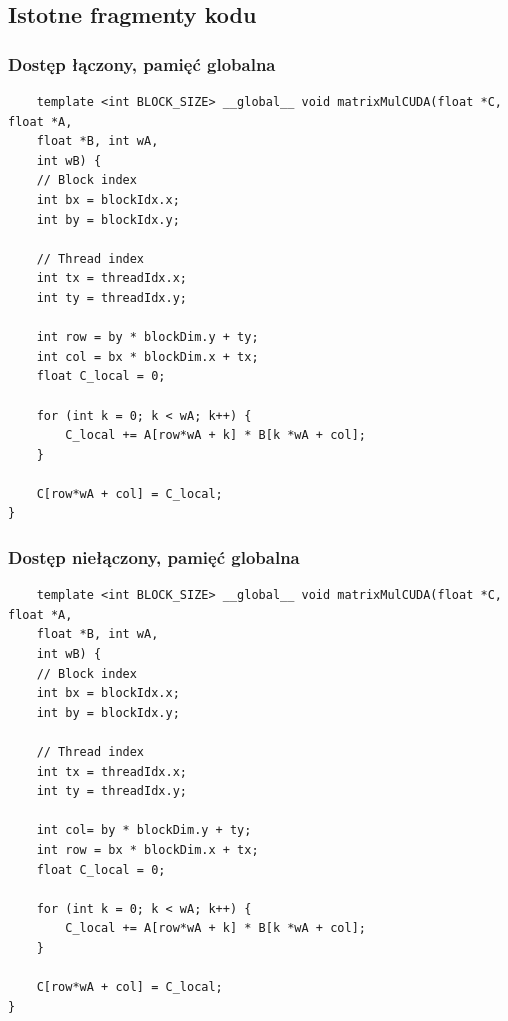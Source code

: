\documentclass[10pt,a4paper]{article}
\begin{document}
\newpage

\subsection{Istotne fragmenty kodu}
\subsubsection*{Dostęp łączony, pamięć globalna}
\begin{lstlisting}
	template <int BLOCK_SIZE> __global__ void matrixMulCUDA(float *C, float *A,
	float *B, int wA,
	int wB) {
	// Block index
	int bx = blockIdx.x;
	int by = blockIdx.y;

	// Thread index
	int tx = threadIdx.x;
	int ty = threadIdx.y;

	int row = by * blockDim.y + ty;
	int col = bx * blockDim.x + tx;
	float C_local = 0;

	for (int k = 0; k < wA; k++) {
		C_local += A[row*wA + k] * B[k *wA + col];
	}

	C[row*wA + col] = C_local;
}
\end{lstlisting}

\subsubsection*{Dostęp niełączony, pamięć globalna}
\begin{lstlisting}
	template <int BLOCK_SIZE> __global__ void matrixMulCUDA(float *C, float *A,
	float *B, int wA,
	int wB) {
	// Block index
	int bx = blockIdx.x;
	int by = blockIdx.y;

	// Thread index
	int tx = threadIdx.x;
	int ty = threadIdx.y;

	int col= by * blockDim.y + ty;
	int row = bx * blockDim.x + tx;
	float C_local = 0;

	for (int k = 0; k < wA; k++) {
		C_local += A[row*wA + k] * B[k *wA + col];
	}

	C[row*wA + col] = C_local;
}
\end{lstlisting}
\end{document}
